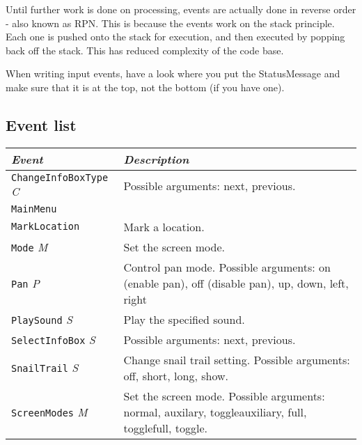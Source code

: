 Until further work is done on processing, events are actually done in
reverse order - also known as RPN. This is because the events work on
the stack principle. Each one is pushed onto the stack for execution,
and then executed by popping back off the stack. This has reduced
complexity of the code base.

When writing input events, have a look where you put the StatusMessage
and make sure that it is at the top, not the bottom (if you have one).

\subsection{Event list}

{\footnotesize
\begin{tabular}{l|p{7cm}}
\emph{Event} & \emph{Description} \\

\hline

\texttt{ChangeInfoBoxType} \emph{C} & Possible arguments: next,
previous. \\

\hline

\texttt{MainMenu} & \\

\hline

\texttt{MarkLocation} & Mark a location. \\

\hline

\texttt{Mode} \emph{M} & Set the screen mode. \\

\hline

\texttt{Pan} \emph{P} & Control pan mode.  Possible arguments: on
(enable pan), off (disable pan), up, down, left, right \\

\hline

\texttt{PlaySound} \emph{S} & Play the specified sound. \\

\hline

\texttt{SelectInfoBox} \emph{S} & Possible
arguments: next, previous. \\

\hline

\texttt{SnailTrail} \emph{S} & Change snail trail setting.  Possible
arguments: off, short, long, show. \\

\hline

\texttt{ScreenModes} \emph{M} & Set the screen mode.  Possible
arguments: normal, auxilary, toggleauxiliary, full, togglefull,
toggle. \\


\end{tabular}}
